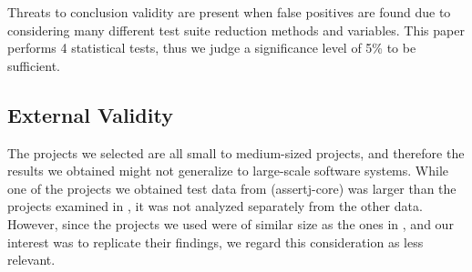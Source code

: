 Threats to conclusion validity are present when false positives are
found due to considering many different test suite reduction methods
and variables. This paper performs 4 %
statistical tests, thus we judge a significance level of 5\% to be
sufficient.

\subsection{External Validity}

The projects we selected are all small to medium-sized projects,
and therefore the results we obtained might not generalize to
large-scale software systems. While one of the projects we obtained
test data from (assertj-core) was larger than the projects examined in
\cite{cruciani2019scalable}, it was not analyzed separately from the
other data. However, since the projects we used were of similar size
as the ones in \cite{cruciani2019scalable}, and our interest was to
replicate their findings, we regard this consideration as less relevant.

